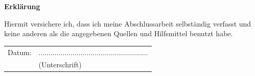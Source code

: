 \documentclass[12pt,a4paper,bibliography=totocnumbered,listof=totocnumbered]{scrartcl}
\begin{document}
\newpage

\thispagestyle{empty}
\begin{center}
	\vspace*{5em}
	\huge\textbf{Erklärung}\\
\end{center}
\vspace{2em}
Hiermit versichere ich, dass ich meine Abschlussarbeit selbständig verfasst und keine anderen als die angegebenen Quellen und Hilfsmittel benutzt habe.

\vspace{4em}
\begin{minipage}{\linewidth}
	\begin{tabular}{p{15em}p{15em}}
		Datum: &  .......................................................\\
		& \centering (Unterschrift)\\
	\end{tabular}
\end{minipage}
\end{document}
